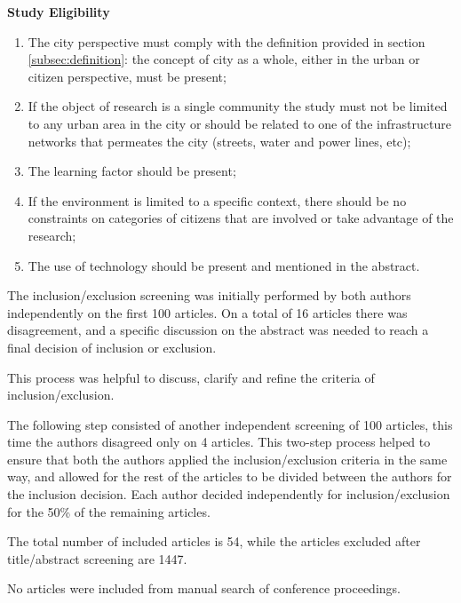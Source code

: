 \textbf{Study Eligibility}
\begin{enumerate}
\item The city perspective must comply with the definition provided in section \ref{subsec:definition}: the concept of city as a whole, either in the urban or citizen perspective, must be present;
\item If the object of research is a single community the study must not be limited to any urban area in the city or should be related to one of the infrastructure networks that permeates the city (streets, water and power lines, etc);
\item The learning factor should be present;
\item If the environment is limited to a specific context, there should be no constraints on categories of citizens that are involved or take advantage of the research;
\item The use of technology should be present and mentioned in the abstract.
\end{enumerate}

The inclusion/exclusion screening was initially performed by both authors independently on the first 100 articles. On a total of 16 articles there was disagreement, and a specific discussion on the abstract was needed to reach a final decision of inclusion or exclusion.

This process was helpful to discuss, clarify and refine the criteria of inclusion/exclusion.

The following step consisted of another independent screening of 100 articles, this time the authors disagreed only on 4 articles. This two-step process helped to ensure that both the authors applied the inclusion/exclusion criteria in the same way, and allowed for the rest of the articles to be divided between the authors for the inclusion decision. Each author decided independently for inclusion/exclusion for the 50\% of the remaining articles.

The total number of included articles is 54, while the articles excluded after title/abstract screening are 1447.

No articles were included from manual search of conference proceedings.